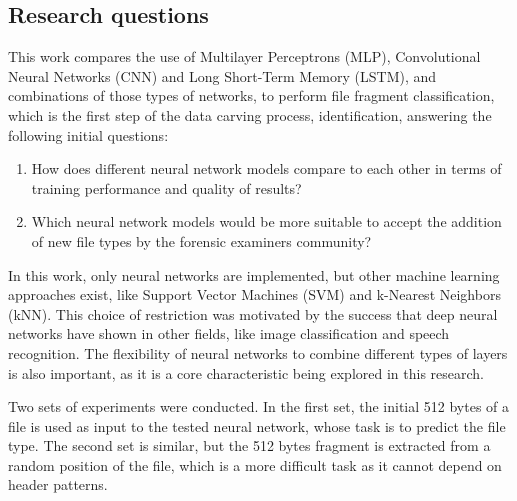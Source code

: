 \subsection{Research questions}
This work compares the use of Multilayer Perceptrons (MLP), Convolutional Neural Networks (CNN) and Long Short-Term Memory (LSTM), and combinations of those types of networks, to perform file fragment classification, which is the first step of the data carving process, identification, answering the following initial questions:

\begin{enumerate}[itemindent=\parindent,label=\textbf{Q\arabic*.}]

    \item How does different neural network models compare to each other in terms of training performance and quality of results?
    
    \item Which neural network models would be more suitable to accept the addition of new file types by the forensic examiners community? 

\end{enumerate}

In this work, only neural networks are implemented, but other machine learning approaches exist, like Support Vector Machines (SVM) and k-Nearest Neighbors (kNN). This choice of restriction was motivated by the success that deep neural networks have shown in other fields, like image classification and speech recognition. The flexibility of neural networks to combine different types of layers is also important, as it is a core characteristic being explored in this research.

Two sets of experiments were conducted. In the first set, the initial 512 bytes of a file is used as input to the tested neural network, whose task is to predict the file type. The second set is similar, but the 512 bytes fragment is extracted from a random position of the file, which is a more difficult task as it cannot depend on header patterns.
